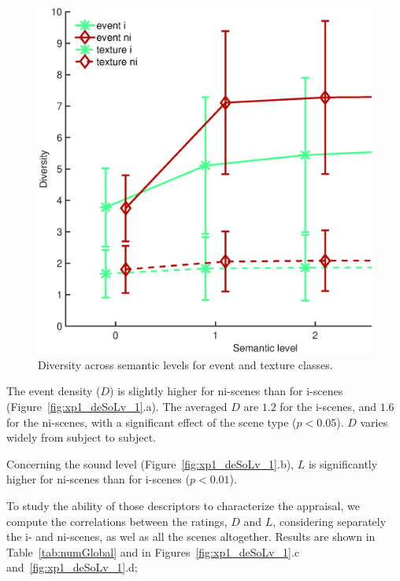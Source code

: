 \documentclass[twoside,twocolumn]{article}
\begin{document}
\begin{figure}[t!]
\centering
\includegraphics[width=.4\paperwidth]{../gfxMatlab/xp1_div_1.eps} 
\caption{\label{fig:analyseDensitySnrGlobal3} Diversity across semantic levels for event and texture classes. }
\end{figure}

The event density ($D$) is slightly higher for ni-scenes than for i-scenes (Figure~\ref{fig:xp1_deSoLv_1}.a). The averaged $D$ are $1.2$ for the i-scenes, and $1.6$ for the ni-scenes, with a significant effect of the scene type ($p<0.05$). $D$ varies widely from subject to subject. 

Concerning the sound level (Figure~\ref{fig:xp1_deSoLv_1}.b), $L$ is significantly higher for ni-scenes than for i-scenes ($p<0.01$). 

To study the ability of those descriptors to characterize the appraisal, we compute the correlations between the ratings, $D$ and $L$, considering separately the i- and ni-scenes, as wel as all the scenes altogether. Results are shown in Table~\ref{tab:numGlobal} and in Figures~\ref{fig:xp1_deSoLv_1}.c and~\ref{fig:xp1_deSoLv_1}.d;  
\end{document}
